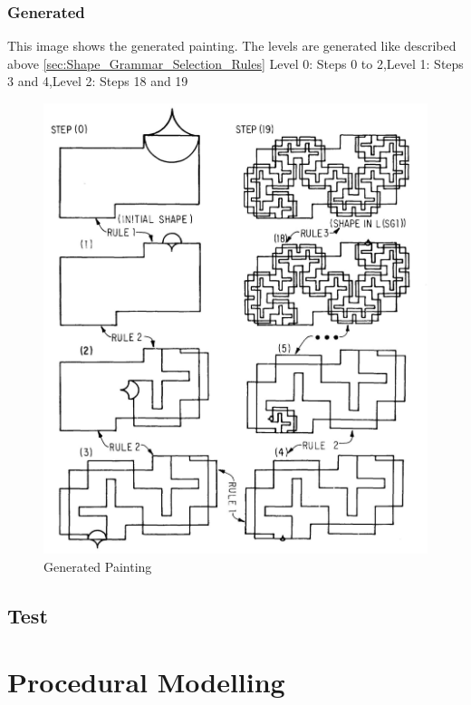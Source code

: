\documentclass[11pt, a4paper]{report}
\begin{document}
\subsubsection{Generated}
This image shows the generated painting. The levels are generated like described above \ref{sec:Shape_Grammar_Selection_Rules} 
\newline
Level 0: Steps 0 to 2,\newline Level 1: Steps 3 and 4,\newline Level 2: Steps 18 and 19
\begin{figure}[!h]
    \centering
    \includegraphics{sg_example.jpg}
    \caption{ Generated Painting\citep{shapeGrammars:1972}}\label{fig:Shape Grammars/Example}
\end{figure}

\subsection{Test}


\pagebreak
\section{Procedural Modelling}
\end{document}
